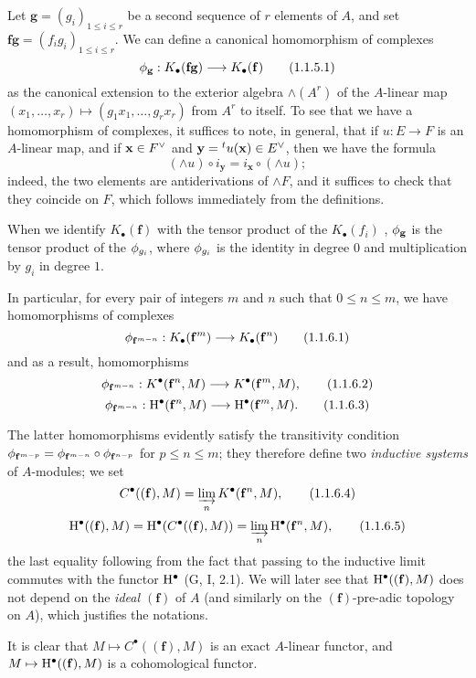 \begin{env}[1.1.5]
\label{III.1.1.5}
Let $\mathbf{g}=(g_i)_{1\leq i\leq r}$ be a second sequence of $r$ elements of $A$, and set $\mathbf{f}\mathbf{g}=(f_i g_i)_{1\leq i\leq r}$.
We can define a canonical homomorphism of complexes
\[
  \vphi_\mathbf{g}:K_\bullet(\mathbf{f}\mathbf{g})\to K_\bullet(\mathbf{f})
  \tag{1.1.5.1}
\]
as the canonical extension to the exterior algebra $\wedge(A^r)$ of the $A$-linear map $(x_1,\dots,x_r)\mapsto(g_1 x_1,\dots,g_r x_r)$ from $A^r$ to itself.
To see that we have a homomorphism of complexes, it suffices to note, in general, that if $u:E\to F$ is an $A$-linear map, and if $\mathbf{x}\in{F}^\vee$ and $\mathbf{y}={}^t u(\mathbf{x})\in{E}^\vee$, then we have the formula
\[
  (\wedge u)\circ i_\mathbf{y}=i_\mathbf{x}\circ(\wedge u);
  \tag{1.1.5.2}
\]
indeed, the two elements are antiderivations of $\wedge F$, and it suffices to check that they coincide on $F$, which follows immediately from the definitions.

When we identify $K_\bullet(\mathbf{f})$ with the tensor product of the $K_\bullet(f_i)$ , $\phi_\mathbf{g}$ is the tensor product of the $\phi_{g_i}$, where $\phi_{g_i}$ is the identity in degree $0$ and multiplication by $g_i$ in degree $1$.
\end{env}

\begin{env}[1.1.6]
\label{III.1.1.6}
In particular, for every pair of integers $m$ and $n$ such that $0\leq n\leq m$, we have homomorphisms of complexes
\[
  \vphi_{\mathbf{f}^{m-n}}:K_\bullet(\mathbf{f}^m)\to K_\bullet(\mathbf{f}^n)
  \tag{1.1.6.1}
\]
and as a result, homomorphisms
\[
  \vphi_{\mathbf{f}^{m-n}}:K^\bullet(\mathbf{f}^n,M)\to K^\bullet(\mathbf{f}^m,M),
  \tag{1.1.6.2}
\]
\[
  \vphi_{\mathbf{f}^{m-n}}:\HH^\bullet(\mathbf{f}^n,M)\to\HH^\bullet(\mathbf{f}^m,M).
  \tag{1.1.6.3}
\]

The latter homomorphisms evidently satisfy the transitivity condition $\phi_{\mathbf{f}^{m-p}}=\phi_{\mathbf{f}^{m-n}}\circ\phi_{\mathbf{f}^{n-p}}$ for $p\leq n\leq m$; they therefore define two \emph{inductive systems} of $A$-modules; we set
\[
  C^\bullet((\mathbf{f}),M)=\varinjlim_n K^\bullet(\mathbf{f}^n,M),
  \tag{1.1.6.4}
\]
\[
  \mathrm{H}^\bullet((\mathbf{f}),M)=\mathrm{H}^\bullet(C^\bullet((\mathbf{f}),M))=\varinjlim_n\mathrm{H}^\bullet(\mathbf{f}^n,M),
  \tag{1.1.6.5}
\]
the last equality following from the fact that passing to the inductive limit commutes with the functor $\mathrm{H}^\bullet$ (G, I, 2.1).
We will later see  that $\mathrm{H}^\bullet((\mathbf{f}),M)$ does not depend on the \emph{ideal $(\mathbf{f})$} of $A$ (and similarly on the $(\mathbf{f})$-pre-adic topology on $A$), which justifies the notations.

It is clear that $M\mapsto C^\bullet((\mathbf{f}),M)$ is an exact $A$-linear functor, and $M\mapsto\HH^\bullet((\mathbf{f}),M)$ is a cohomological functor.
\end{env}

